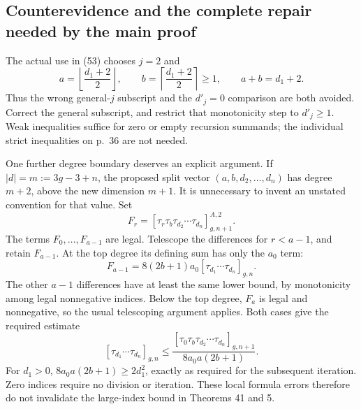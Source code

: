 \documentclass[10pt]{article}
\begin{document}
\subsection*{Counterevidence and the complete repair needed by the main proof}
The actual use in (53) chooses \(j=2\) and \[a=\left\lfloor\frac{d_1+2}{2}\right\rfloor,\qquad
 b=\left\lceil\frac{d_1+2}{2}\right\rceil\ge1,\qquad a+b=d_1+2.\] Thus the wrong general-\(j\) subscript and the \(d'_j=0\) comparison are both avoided. Correct the general subscript, and restrict that monotonicity step to \(d'_j\ge1\). Weak inequalities suffice for zero or empty recursion summands; the individual strict inequalities on p. 36 are not needed.\par
One further degree boundary deserves an explicit argument. If \(|d|=m:=3g-3+n\), the proposed split vector \((a,b,d_2,\ldots,d_n)\) has degree \(m+2\), above the new dimension \(m+1\). It is unnecessary to invent an unstated convention for that value. Set \[F_r=[\tau_r\tau_b\tau_{d_2}\cdots\tau_{d_n}]^{A,2}_{g,n+1}.\] The terms \(F_0,\ldots,F_{a-1}\) are legal. Telescope the differences for \(r<a-1\), and retain \(F_{a-1}\). At the top degree its defining sum has only the \(a_0\) term: \[F_{a-1}=8(2b+1)a_0[\tau_{d_1}\cdots\tau_{d_n}]_{g,n}.\] The other \(a-1\) differences have at least the same lower bound, by monotonicity among legal nonnegative indices. Below the top degree, \(F_a\) is legal and nonnegative, so the usual telescoping argument applies. Both cases give the required estimate \[[\tau_{d_1}\cdots\tau_{d_n}]_{g,n}
 \le
 \frac{[\tau_0\tau_b\tau_{d_2}\cdots\tau_{d_n}]_{g,n+1}}
      {8a_0a(2b+1)}.\] For \(d_1>0\), \(8a_0a(2b+1)\ge2d_1^2\), exactly as required for the subsequent iteration. Zero indices require no division or iteration. These local formula errors therefore do not invalidate the large-index bound in Theorems 41 and 5.\par
\end{document}
